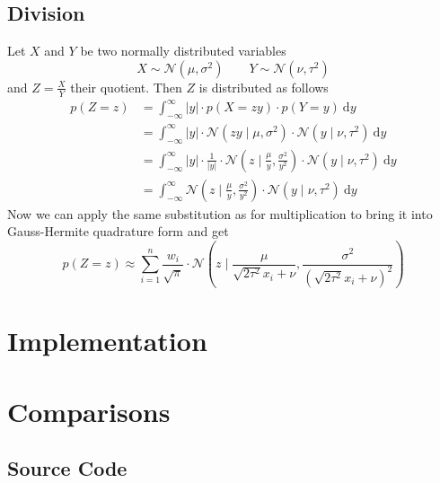\documentclass[11pt,a4paper]{book}
\begin{document}
\section{Division}

Let $X$ and $Y$ be two normally distributed variables
\begin{equation*}
  X \sim \mathcal{N}(\mu, \sigma^{2}) \qquad Y \sim \mathcal{N}(\nu, \tau^{2})
\end{equation*}
and $Z = \frac{X}{Y}$ their quotient. Then $Z$ is distributed as follows
\begin{align*}
  p(Z = z) & = \int_{-\infty}^{\infty} |y| \cdot p\left(X = zy\right) \cdot p(Y = y)~\mathrm{d}y\\
           & = \int_{-\infty}^{\infty} |y| \cdot \mathcal{N}\left( zy \mid \mu, \sigma^{2} \right) \cdot \mathcal{N}(y \mid \nu, \tau^{2})~\mathrm{d}y\\
           & = \int_{-\infty}^{\infty} |y| \cdot \frac{1}{|y|} \cdot \mathcal{N}\left( z \mid \frac{\mu}{y}, \frac{\sigma^{2}}{y^{2}} \right) \cdot \mathcal{N}(y \mid \nu, \tau^{2})~\mathrm{d}y\\
           & = \int_{-\infty}^{\infty} \mathcal{N}\left( z \mid \frac{\mu}{y}, \frac{\sigma^{2}}{y^{2}} \right) \cdot \mathcal{N}(y \mid \nu, \tau^{2})~\mathrm{d}y
\end{align*}
Now we can apply the same substitution as for multiplication to bring it into
Gauss-Hermite quadrature form and get
\begin{equation*}
  p(Z = z) \approx \sum_{i = 1}^{n} \frac{w_{i}}{\sqrt{\pi}} \cdot \mathcal{N}\left( z \mid \frac{\mu}{\sqrt{2 \tau^{2}} x_{i} + \nu}, \frac{\sigma^{2}}{\left(\sqrt{2 \tau^{2}} x_{i} + \nu\right)^{2}} \right)
\end{equation*}

\chapter{Implementation}
\label{ch:implementation}

\chapter{Comparisons}
\label{ch:comparisons}

\begin{appendices}
  \chapter{Source Code}
  \label{ch:source}

  \inputminted{julia}{src/Transforms.jl}
\end{appendices}

\printbibliography
\end{document}
